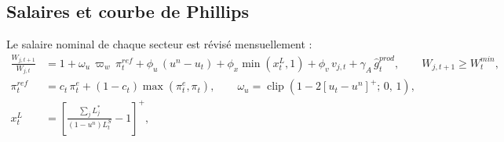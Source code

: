 \documentclass[11pt,a4paper]{article}
\newcommand{\pos}[1]{{\left[#1\right]^{+}}}
\newcommand{\clip}[3]{\operatorname{clip}\!\left(#1;\,#2,\,#3\right)}
\begin{document}
\subsection{Salaires et courbe de Phillips}
Le salaire nominal de chaque secteur est révisé mensuellement :
\begin{equation}
\begin{split}
\frac{W_{j,t+1}}{W_{j,t}} &= 1 + \omega_u\,\varpi_w\,\pi^{ref}_t + \phi_u\,(u^n - u_t) + \phi_x\min(x^L_t,1) + \phi_v\, v_{j,t} + \gamma_A\, \hat g^{prod}_t,
\qquad W_{j,t+1} \ge W^{min}_t,\\
\pi^{ref}_t &= c_t\,\pi^e_t + (1-c_t)\max(\pi^e_t,\pi_t), \qquad \omega_u = \clip{1-2\pos{u_t-u^n}}{0}{1},\\
x^L_t &= \pos{\frac{\sum_j L^\ast_j}{(1-u^n)L^S_t}-1},
\end{split}
\label{eq:wage}
\end{equation}
\end{document}
